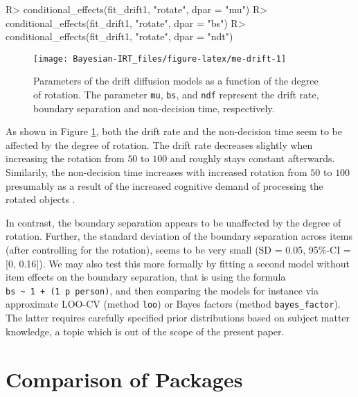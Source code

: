 \documentclass[
]{jss}
\begin{document}
\begin{CodeChunk}

\begin{CodeInput}
R> conditional_effects(fit_drift1, "rotate", dpar = "mu")
R> conditional_effects(fit_drift1, "rotate", dpar = "bs")
R> conditional_effects(fit_drift1, "rotate", dpar = "ndt")
\end{CodeInput}
\end{CodeChunk}

\begin{CodeChunk}
\begin{figure}

{\centering \texttt{[image: Bayesian-IRT\_files/figure-latex/me-drift-1]} 

}

\caption[Parameters of the drift diffusion models as a function of the degree of rotation]{Parameters of the drift diffusion models as a function of the degree of rotation. The parameter \texttt{mu}, \texttt{bs}, and \texttt{ndf} represent the drift rate, boundary separation and non-decision time, respectively.}\label{fig:me-drift}
\end{figure}
\end{CodeChunk}

As shown in Figure \ref{fig:me-drift}, both the drift rate and the
non-decision time seem to be affected by the degree of rotation. The
drift rate decreases slightly when increasing the rotation from \(50\)
to \(100\) and roughly stays constant afterwards. Similarily, the
non-decision time increases with increased rotation from \(50\) to
\(100\) presumably as a result of the increased cognitive demand of
processing the rotated objects \citep{diffIRT}.

In contrast, the boundary separation appears to be unaffected by the
degree of rotation. Further, the standard deviation of the boundary
separation across items (after controlling for the rotation), seems to
be very small (SD = 0.05, 95\%-CI = {[}0, 0.16{]}). We may also test
this more formally by fitting a second model without item effects on the
boundary separation, that is using the formula
\texttt{bs\ \textasciitilde{}\ 1\ +\ (1\ \textbar{}p\textbar{}\ person)},
and then comparing the models for instance via approximate LOO-CV
(method \texttt{loo}) or Bayes factors (method \texttt{bayes\_factor}).
The latter requires carefully specified prior distributions based on
subject matter knowledge, a topic which is out of the scope of the
present paper.

\hypertarget{comparison}{%
\section{Comparison of Packages}\label{comparison}}
\end{document}
